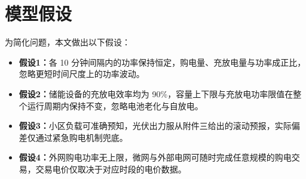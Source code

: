 
\section{模型假设}

为简化问题，本文做出以下假设：

\begin{itemize}[itemindent=2em]
\item \textbf{假设1：}各 10 分钟间隔内的功率保持恒定，购电量、充放电量与功率成正比，忽略更短时间尺度上的功率波动。
\item \textbf{假设2：}储能设备的充放电效率均为 90\%，容量上下限与充放电功率限值在整个运行周期内保持不变，忽略电池老化与自放电。
\item \textbf{假设3：}小区负载可准确预知，光伏出力服从附件三给出的滚动预报，实际偏差仅通过紧急购电机制兜底。
\item \textbf{假设4：}外网购电功率无上限，微网与外部电网可随时完成任意规模的购电交易，交易电价仅取决于对应时段的电价数据。
\end{itemize}
